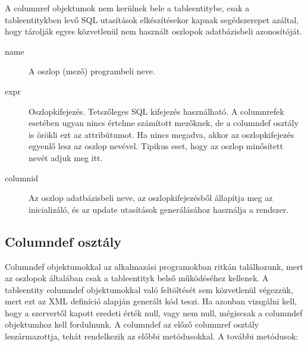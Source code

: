 A columnref objektumok nem kerülnek bele a tableentitybe,
csak a tableentitykben levő SQL utasítások elkészítésekor
kapnak segédszerepet azáltal, hogy tárolják egyes
közvetlenül nem használt oszlopok adatbázisbeli azonosítóját.

\begin{description}
\item[name]        
    A oszlop (mező) programbeli neve.
\item[expr]
    Oszlopkifejezés. 
    Tetszőleges SQL kifejezés használható.
    A columnrefek esetében ugyan nincs értelme számított mezőknek,
    de a columndef osztály is örökli ezt az attribútumot.
    Ha nincs megadva, akkor az oszlopkifejezés egyenlő lesz
    az oszlop nevével. Tipikus eset, hogy az oszlop minősített 
    nevét adjuk  meg itt.
\item[columnid]
    Az oszlop adatbázisbeli neve, 
    az oszlopkifejezésből állapítja meg az inicializáló,
    és az update utasítások generálásához használja a rendszer.
\end{description}



\subsection{Columndef osztály}

Columndef objektumokkal az alkalmazási programokban ritkán találkozunk, 
mert az oszlopok általában csak a tableentityk belső működéséhez kellenek.
A tableentity columndef objektumokkal való feltöltését sem közvetlenül 
végezzük, mert ezt az XML definíció alapján generált kód teszi.
Ha azonban vizsgálni kell, hogy a szervertől kapott eredeti érték
null, vagy nem null, mégiscsak a columndef objektumhoz kell fordulnunk.
A columndef az előző columnref osztály leszármazottja,
tehát rendelkezik az előbbi metódusokkal. A további metódusok:

